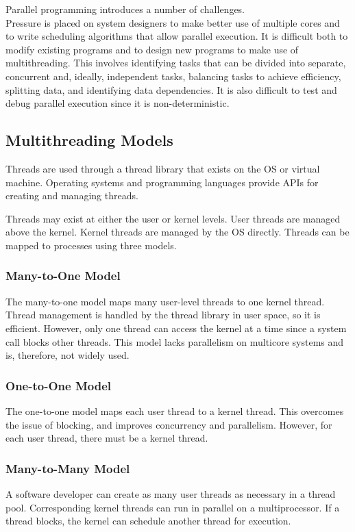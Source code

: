 Parallel programming introduces a number of challenges.\\
Pressure is placed on system designers to make better use of multiple cores and to write scheduling algorithms that allow parallel execution.
It is difficult both to modify existing programs and to design new programs to make use of multithreading.
This involves identifying tasks that can be divided into separate, concurrent and, ideally, independent tasks, balancing tasks to achieve efficiency, splitting data, and identifying data dependencies.
It is also difficult to test and debug parallel execution since it is non-deterministic.
{\color{gray}
\subsection{Multithreading Models}
Threads are used through a thread library that exists on the OS or virtual machine.
Operating systems and programming languages provide APIs for creating and managing threads.

Threads may exist at either the user or kernel levels.
User threads are managed above the kernel.
Kernel threads are managed by the OS directly.
Threads can be mapped to processes using three models.
\subsubsection{Many-to-One Model}
The many-to-one model maps many user-level threads to one kernel thread.
Thread management is handled by the thread library in user space, so it is efficient.
However, only one thread can access the kernel at a time since a system call blocks other threads.
This model lacks parallelism on multicore systems and is, therefore, not widely used.
\subsubsection{One-to-One Model}
The one-to-one model maps each user thread to a kernel thread.
This overcomes the issue of blocking, and improves concurrency and parallelism.
However, for each user thread, there must be a kernel thread.
\subsubsection{Many-to-Many Model}
A software developer can create as many user threads as necessary in a thread pool.
Corresponding kernel threads can run in parallel on a multiprocessor.
If a thread blocks, the kernel can schedule another thread for execution.
}
